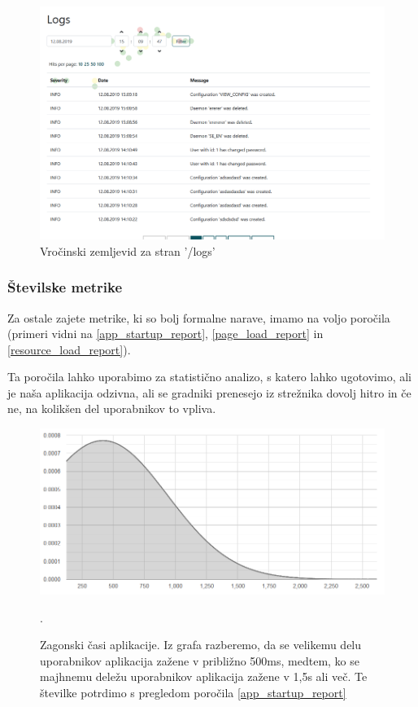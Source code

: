\documentclass[a4paper, 12pt]{book}
\begin{document}
\begin{figure}[h]
	\begin{center}
		\includegraphics[width=1\textwidth]{heatmap_2.png}
	\end{center}
	\caption{Vročinski zemljevid  za stran '/logs'}
	\label{img:heatmap2}
\end{figure}

\subsubsection{Številske metrike}

Za ostale zajete metrike, ki so bolj formalne narave, imamo na voljo poročila (primeri vidni na \ref{app_startup_report}, \ref{page_load_report} in \ref{resource_load_report}).

Ta poročila lahko uporabimo za statistično analizo, s katero lahko ugotovimo, ali je naša aplikacija odzivna, ali se gradniki prenesejo iz strežnika dovolj hitro in če ne, na kolikšen del uporabnikov to vpliva.

\begin{figure}[h]
	\begin{center}
		\includegraphics[width=1\textwidth]{app_startup_graph.png}
	\end{center}
	\caption{Zagonski časi aplikacije. Iz grafa razberemo, da se velikemu delu uporabnikov aplikacija zažene v približno 500ms, medtem, ko se majhnemu deležu uporabnikov aplikacija zažene v 1,5s ali več. Te številke potrdimo s pregledom poročila \ref{app_startup_report}}.
	\label{img:graph_app_startup}
\end{figure}
\end{document}
